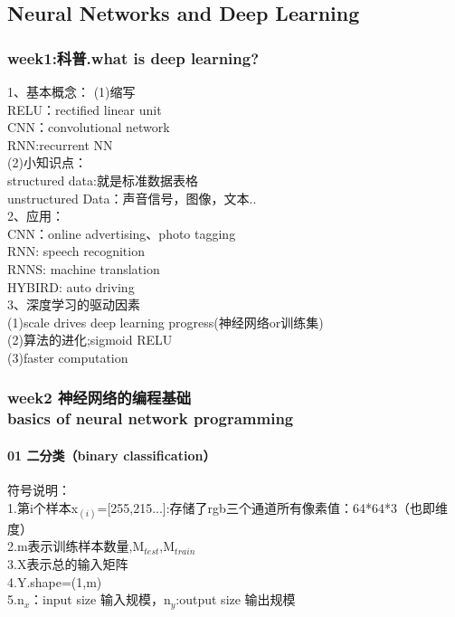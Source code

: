 \documentclass[a4paper,12pt]{article}
\begin{document}
\begin{CJK*}{UTF8}{gbsn}%

\part{Neural Networks and Deep Learning}
 \section{week1:科普.what is deep learning?}
  \begin{flushleft}
1、基本概念：
(1)缩写\\
\qquad RELU：rectified linear unit\\
\qquad CNN：convolutional network\\
\qquad RNN:recurrent NN\\
(2)小知识点：\\
\qquad structured data:就是标准数据表格\\
\qquad unstructured Data：声音信号，图像，文本..\\
2、应用：\\
\quad CNN：online advertising、photo tagging\\
\quad RNN: speech recognition\\
\quad RNNS: machine translation\\
\quad HYBIRD: auto driving\\
3、深度学习的驱动因素\\
\quad  (1)scale drives deep learning progress(神经网络or训练集)\\
\quad (2)算法的进化;sigmoid RELU\\
\quad (3)faster computation\\

\end{flushleft}
\section{week2 神经网络的编程基础 \\basics of neural network programming}
 \subsection{01 二分类（binary classification）}
  \begin{flushleft}
    符号说明：\\
\quad    1.第i个样本x$_{(i)}$=[255,215...]:存储了rgb三个通道所有像素值：64*64*3（也即维度）\\
\quad    2.m表示训练样本数量,M$ _{test}$,M$_{train}$\\
\quad    3.X表示总的输入矩阵\\
\quad    4.Y.shape=(1,m)\\
\quad    5.n$_x$：input size 输入规模，n$_y$:output size 输出规模\\
   \end{flushleft}   

\end{CJK*}
\end{document}

